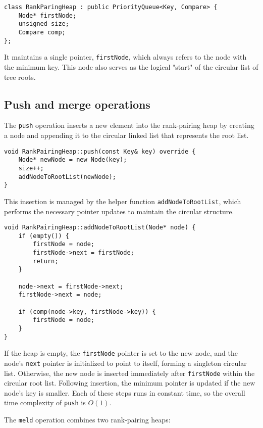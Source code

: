 \begin{verbatim}
class RankParingHeap : public PriorityQueue<Key, Compare> {
    Node* firstNode;
    unsigned size;
    Compare comp;
};
\end{verbatim}

It maintains a single pointer, \texttt{firstNode}, which always refers to the node with the minimum key. This node also serves as the logical "start" of the circular list of tree roots.

\subsection{Push and merge operations}

The \texttt{push} operation inserts a new element into the rank-pairing heap by creating a node and appending it to the circular linked list that represents the root list.

\begin{verbatim}
void RankPairingHeap::push(const Key& key) override {
    Node* newNode = new Node(key);
    size++;
    addNodeToRootList(newNode);
}
\end{verbatim}

This insertion is managed by the helper function \texttt{addNodeToRootList}, which performs the necessary pointer updates to maintain the circular structure.

\begin{verbatim}
void RankPairingHeap::addNodeToRootList(Node* node) {
    if (empty()) {
        firstNode = node;
        firstNode->next = firstNode;
        return;
    }
    
    node->next = firstNode->next;
    firstNode->next = node;
    
    if (comp(node->key, firstNode->key)) {
        firstNode = node;
    }
}
\end{verbatim}

If the heap is empty, the \texttt{firstNode} pointer is set to the new node, and the node's \texttt{next} pointer is initialized to point to itself, forming a singleton circular list. Otherwise, the new node is inserted immediately after \texttt{firstNode} within the circular root list. Following insertion, the minimum pointer is updated if the new node's key is smaller. Each of these steps runs in constant time, so the overall time complexity of \texttt{push} is \(O(1)\).

The \texttt{meld} operation combines two rank-pairing heaps:

